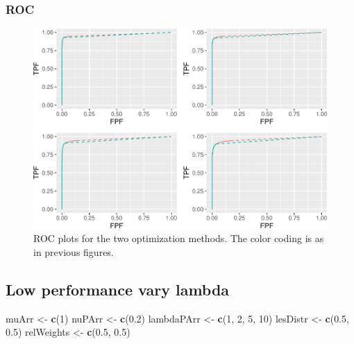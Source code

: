 \documentclass[
]{book}
\newenvironment{Shaded}{\begin{snugshade}}{\end{snugshade}}
\newcommand{\DecValTok}[1]{\textcolor[rgb]{0.00,0.00,0.81}{#1}}
\newcommand{\FloatTok}[1]{\textcolor[rgb]{0.00,0.00,0.81}{#1}}
\newcommand{\KeywordTok}[1]{\textcolor[rgb]{0.13,0.29,0.53}{\textbf{#1}}}
\newcommand{\NormalTok}[1]{#1}
\newcommand{\StringTok}[1]{\textcolor[rgb]{0.31,0.60,0.02}{#1}}
\begin{document}
\hypertarget{roc-7}{%
\subsubsection{ROC}\label{roc-7}}

\begin{figure}
\centering
\includegraphics{22-optim-op-point_files/figure-latex/optim-op-point-high-performance-vary-lambda-vary-all-roc-1.pdf}
\caption{\label{fig:optim-op-point-high-performance-vary-lambda-vary-all-roc}ROC plots for the two optimization methods. The color coding is as in previous figures.}
\end{figure}

\hypertarget{optim-op-point-low-performance-vary-lambda}{%
\subsection{Low performance vary lambda}\label{optim-op-point-low-performance-vary-lambda}}

\begin{Shaded}
\begin{Highlighting}[]
\NormalTok{muArr <-}\StringTok{ }\KeywordTok{c}\NormalTok{(}\DecValTok{1}\NormalTok{)}
\NormalTok{nuPArr <-}\StringTok{ }\KeywordTok{c}\NormalTok{(}\FloatTok{0.2}\NormalTok{)}
\NormalTok{lambdaPArr <-}\StringTok{ }\KeywordTok{c}\NormalTok{(}\DecValTok{1}\NormalTok{, }\DecValTok{2}\NormalTok{, }\DecValTok{5}\NormalTok{, }\DecValTok{10}\NormalTok{)}
\NormalTok{lesDistr <-}\StringTok{ }\KeywordTok{c}\NormalTok{(}\FloatTok{0.5}\NormalTok{, }\FloatTok{0.5}\NormalTok{)}
\NormalTok{relWeights <-}\StringTok{ }\KeywordTok{c}\NormalTok{(}\FloatTok{0.5}\NormalTok{, }\FloatTok{0.5}\NormalTok{)}
\end{Highlighting}
\end{Shaded}
\end{document}

